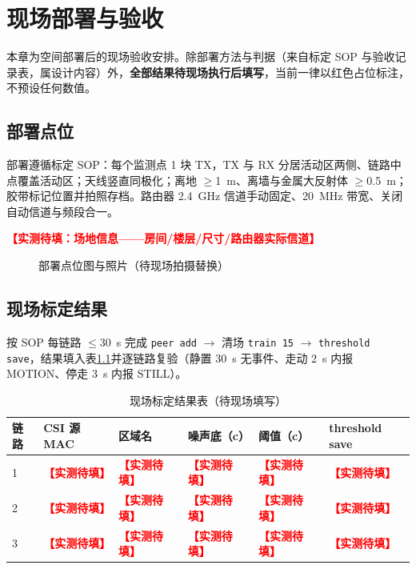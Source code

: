 \chapter{现场部署与验收}\label{chap:deploy}

本章为空间部署后的现场验收安排。除部署方法与判据（来自标定 SOP 与验收记录表，属设计内容）外，\textbf{全部结果待现场执行后填写}，当前一律以红色占位标注，不预设任何数值。

\section{部署点位}

部署遵循标定 SOP：每个监测点 1 块 TX，TX 与 RX 分居活动区两侧、链路中点覆盖活动区；天线竖直同极化；离地 $\ge$1~m、离墙与金属大反射体 $\ge$0.5~m；胶带标记位置并拍照存档。路由器 2.4~GHz 信道手动固定、20~MHz 带宽、关闭自动信道与频段合一。

\textcolor{red}{\textbf{【实测待填：场地信息——房间/楼层/尺寸/路由器实际信道】}}

\begin{figure}[htbp]
  \centering
  \caption{部署点位图与照片（待现场拍摄替换）}
  \label{fig:photo-deploy}
\end{figure}

\section{现场标定结果}

按 SOP 每链路 $\le$30~s 完成 \texttt{peer add} $\to$ 清场 \texttt{train 15} $\to$ \texttt{threshold save}，结果填入表\ref{tab:calib}并逐链路复验（静置 30~s 无事件、走动 2~s 内报 MOTION、停走 3~s 内报 STILL）。

\begin{table}[htbp]
  \centering
  \caption{现场标定结果表（待现场填写）}
  \label{tab:calib}
  \begin{tabular}{llllll}
    \toprule
    \textbf{链路} & \textbf{CSI 源 MAC} & \textbf{区域名} & \textbf{噪声底（c）} & \textbf{阈值（c）} & \textbf{threshold save} \\
    \midrule
    1 & \textcolor{red}{\textbf{【实测待填】}} & \textcolor{red}{\textbf{【实测待填】}} & \textcolor{red}{\textbf{【实测待填】}} & \textcolor{red}{\textbf{【实测待填】}} & \textcolor{red}{\textbf{【实测待填】}} \\
    2 & \textcolor{red}{\textbf{【实测待填】}} & \textcolor{red}{\textbf{【实测待填】}} & \textcolor{red}{\textbf{【实测待填】}} & \textcolor{red}{\textbf{【实测待填】}} & \textcolor{red}{\textbf{【实测待填】}} \\
    3 & \textcolor{red}{\textbf{【实测待填】}} & \textcolor{red}{\textbf{【实测待填】}} & \textcolor{red}{\textbf{【实测待填】}} & \textcolor{red}{\textbf{【实测待填】}} & \textcolor{red}{\textbf{【实测待填】}} \\
    \bottomrule
  \end{tabular}
\end{table}

